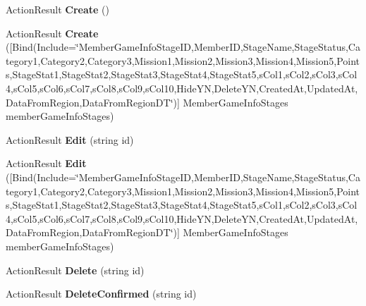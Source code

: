 \begin{DoxyCompactItemize}
\item 
Action\+Result {\bfseries Create} ()\hypertarget{class_cloud_bread_admin_web_1_1_controllers_1_1_member_game_info_stages_controller_a3d44da9c2bfa9cf364ac2a989a6a5c38}{}\label{class_cloud_bread_admin_web_1_1_controllers_1_1_member_game_info_stages_controller_a3d44da9c2bfa9cf364ac2a989a6a5c38}

\item 
Action\+Result {\bfseries Create} (\mbox{[}Bind(Include=\char`\"{}Member\+Game\+Info\+Stage\+ID,Member\+ID,Stage\+Name,Stage\+Status,Category1,Category2,Category3,Mission1,Mission2,Mission3,Mission4,Mission5,Points,Stage\+Stat1,Stage\+Stat2,Stage\+Stat3,Stage\+Stat4,Stage\+Stat5,s\+Col1,s\+Col2,s\+Col3,s\+Col4,s\+Col5,s\+Col6,s\+Col7,s\+Col8,s\+Col9,s\+Col10,Hide\+YN,Delete\+YN,Created\+At,Updated\+At,Data\+From\+Region,Data\+From\+Region\+DT\char`\"{})\mbox{]} Member\+Game\+Info\+Stages member\+Game\+Info\+Stages)\hypertarget{class_cloud_bread_admin_web_1_1_controllers_1_1_member_game_info_stages_controller_aa9ff01c4930ec56f82be42cd8fd5d6f8}{}\label{class_cloud_bread_admin_web_1_1_controllers_1_1_member_game_info_stages_controller_aa9ff01c4930ec56f82be42cd8fd5d6f8}

\item 
Action\+Result {\bfseries Edit} (string id)\hypertarget{class_cloud_bread_admin_web_1_1_controllers_1_1_member_game_info_stages_controller_abd90e28cf38336c9a2a9c15dd0226eb8}{}\label{class_cloud_bread_admin_web_1_1_controllers_1_1_member_game_info_stages_controller_abd90e28cf38336c9a2a9c15dd0226eb8}

\item 
Action\+Result {\bfseries Edit} (\mbox{[}Bind(Include=\char`\"{}Member\+Game\+Info\+Stage\+ID,Member\+ID,Stage\+Name,Stage\+Status,Category1,Category2,Category3,Mission1,Mission2,Mission3,Mission4,Mission5,Points,Stage\+Stat1,Stage\+Stat2,Stage\+Stat3,Stage\+Stat4,Stage\+Stat5,s\+Col1,s\+Col2,s\+Col3,s\+Col4,s\+Col5,s\+Col6,s\+Col7,s\+Col8,s\+Col9,s\+Col10,Hide\+YN,Delete\+YN,Created\+At,Updated\+At,Data\+From\+Region,Data\+From\+Region\+DT\char`\"{})\mbox{]} Member\+Game\+Info\+Stages member\+Game\+Info\+Stages)\hypertarget{class_cloud_bread_admin_web_1_1_controllers_1_1_member_game_info_stages_controller_a45dd1554c0f5eafacddade4279d816c2}{}\label{class_cloud_bread_admin_web_1_1_controllers_1_1_member_game_info_stages_controller_a45dd1554c0f5eafacddade4279d816c2}

\item 
Action\+Result {\bfseries Delete} (string id)\hypertarget{class_cloud_bread_admin_web_1_1_controllers_1_1_member_game_info_stages_controller_a06a6927485c14f945472bbb880fcd206}{}\label{class_cloud_bread_admin_web_1_1_controllers_1_1_member_game_info_stages_controller_a06a6927485c14f945472bbb880fcd206}

\item 
Action\+Result {\bfseries Delete\+Confirmed} (string id)\hypertarget{class_cloud_bread_admin_web_1_1_controllers_1_1_member_game_info_stages_controller_a39023524e891224d1664f4b37e326715}{}\label{class_cloud_bread_admin_web_1_1_controllers_1_1_member_game_info_stages_controller_a39023524e891224d1664f4b37e326715}

\end{DoxyCompactItemize}
